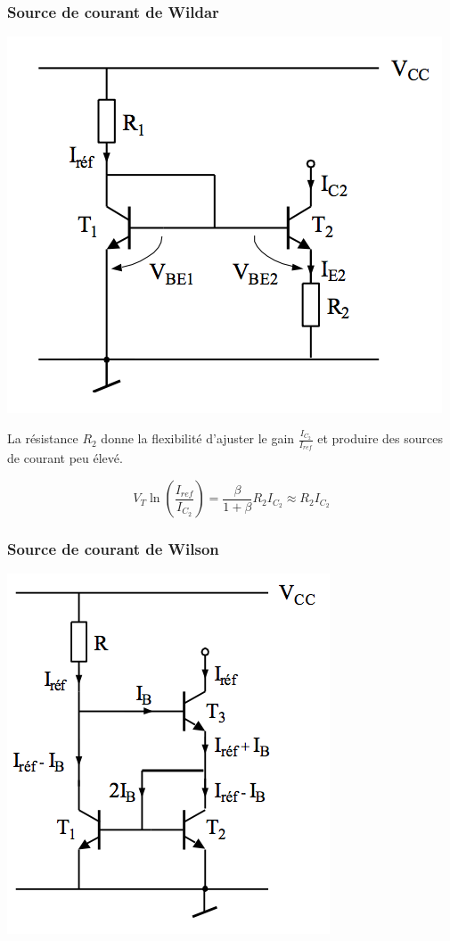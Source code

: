 \documentclass[]{article}
\begin{document}
\subsubsection{Source de courant de Wildar}
\includegraphics[scale=0.7]{courantwildar}

La résistance $R_2$ donne la flexibilité d’ajuster le gain $\frac{I_{C_2}}{I_{ref}}$ et produire des sources de 
courant peu élevé.

$$ V_T \ln{(\frac{I_{ref}}{I_{C_2}})} = \frac{\beta}{1+\beta} R_2 I_{C_2} \approx  R_2 I_{C_2}$$

\subsubsection{Source de courant de Wilson}
\includegraphics[scale=0.7]{courantwilson}
\end{document}
